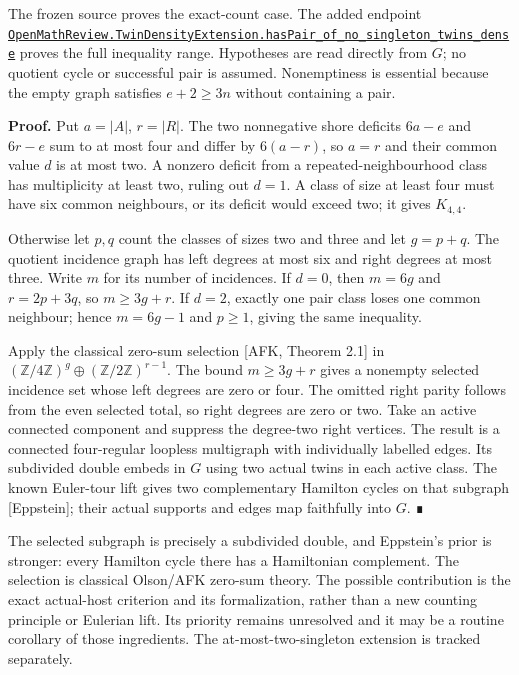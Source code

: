 \documentclass[
  11pt,
]{article}
\newcounter{none} %
\begin{document}
The frozen source proves the exact-count case. The added endpoint
\href{https://github.com/alejandrozu/openmath-2026-judging/blob/70c5ec3107658182f22c207d4c50f53f9cb3e602/robert-review-2026-10-07/lean/TwinDensityExtension.lean\#L132}{\texttt{OpenMathReview.TwinDensityExtension.hasPair\_of\_no\_singleton\_twins\_dense}}
proves the full inequality range. Hypotheses are read directly from
\(G\); no quotient cycle or successful pair is assumed. Nonemptiness is
essential because the empty graph satisfies \(e+2\geq3n\) without
containing a pair.

\textbf{Proof.} Put \(a=|A|\), \(r=|R|\). The two nonnegative shore
deficits \(6a-e\) and \(6r-e\) sum to at most four and differ by
\(6(a-r)\), so \(a=r\) and their common value \(d\) is at most two. A
nonzero deficit from a repeated-neighbourhood class has multiplicity at
least two, ruling out \(d=1\). A class of size at least four must have
six common neighbours, or its deficit would exceed two; it gives
\(K_{4,4}\).

Otherwise let \(p,q\) count the classes of sizes two and three and let
\(g=p+q\). The quotient incidence graph has left degrees at most six and
right degrees at most three. Write \(m\) for its number of incidences.
If \(d=0\), then \(m=6g\) and \(r=2p+3q\), so \(m\geq3g+r\). If \(d=2\),
exactly one pair class loses one common neighbour; hence \(m=6g-1\) and
\(p\geq1\), giving the same inequality.

Apply the classical zero-sum selection {[}AFK, Theorem 2.1{]} in
\((\mathbb Z/4\mathbb Z)^g\oplus(\mathbb Z/2\mathbb Z)^{r-1}\). The
bound \(m\geq3g+r\) gives a nonempty selected incidence set whose left
degrees are zero or four. The omitted right parity follows from the even
selected total, so right degrees are zero or two. Take an active
connected component and suppress the degree-two right vertices. The
result is a connected four-regular loopless multigraph with individually
labelled edges. Its subdivided double embeds in \(G\) using two actual
twins in each active class. The known Euler-tour lift gives two
complementary Hamilton cycles on that subgraph {[}Eppstein{]}; their
actual supports and edges map faithfully into \(G\). ∎

The selected subgraph is precisely a subdivided double, and Eppstein's
prior is stronger: every Hamilton cycle there has a Hamiltonian
complement. The selection is classical Olson/AFK zero-sum theory. The
possible contribution is the exact actual-host criterion and its
formalization, rather than a new counting principle or Eulerian lift.
Its priority remains unresolved and it may be a routine corollary of
those ingredients. The at-most-two-singleton extension is tracked
separately.
\end{document}
